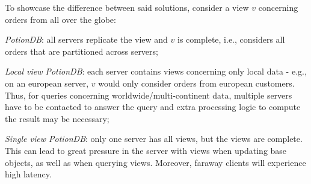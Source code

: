 \documentclass[sigplan,10pt]{acmart}
\begin{document}
To showcase the difference between said solutions, consider a view $v$ concerning orders from all over the globe:

\begin{compactitem}
	\item \emph{PotionDB}: all servers replicate the view and $v$ is complete, i.e., considers all orders that are partitioned across servers;
	\item \emph{Local view PotionDB}: each server contains views concerning only local data - e.g., on an european server, $v$ would only consider orders from european customers.
	Thus, for queries concerning worldwide/multi-continent data, multiple servers have to be contacted to answer the query and extra processing logic to compute the result may be necessary;
	\item \emph{Single view PotionDB}: only one server has all views, but the views are complete.
	This can lead to great pressure in the server with views when updating base objects, as well as when querying views.
	Moreover, faraway clients will experience high latency.
\end{compactitem}

\end{document}
